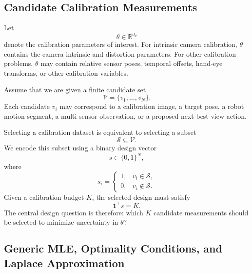 \documentclass[letterpaper, 9
 pt, conference]{ieeeconf}
\begin{document}
\subsection{Candidate Calibration Measurements}
\label{subsec:candidate_measurements}

Let
\begin{equation}
    \theta \in \mathbb{R}^{d_\theta}
\end{equation}
denote the calibration parameters of interest. For intrinsic camera calibration, $\theta$ contains the camera intrinsic and distortion parameters. For other calibration problems, $\theta$ may contain relative sensor poses, temporal offsets, hand-eye transforms, or other calibration variables.

Assume that we are given a finite candidate set
\begin{equation}
    \mathcal{V}=\{v_1,\ldots,v_N\}.
\end{equation}
Each candidate $v_i$ may correspond to a calibration image, a target pose, a robot motion segment, a multi-sensor observation, or a proposed next-best-view action.

Selecting a calibration dataset is equivalent to selecting a subset
\begin{equation}
    \mathcal{S}\subseteq\mathcal{V}.
\end{equation}
We encode this subset using a binary design vector
\begin{equation}
    s\in\{0,1\}^{N},
\end{equation}
where
\begin{equation}
    s_i =
    \begin{cases}
        1, & v_i\in\mathcal{S},\\
        0, & v_i\notin\mathcal{S}.
    \end{cases}
\end{equation}
Given a calibration budget $K$, the selected design must satisfy
\begin{equation}
    \mathbf{1}^{\top}s=K.
\end{equation}
The central design question is therefore: which $K$ candidate measurements should be selected to minimize uncertainty in $\theta$?

\subsection{Generic MLE, Optimality Conditions, and Laplace Approximation}
\label{subsec:mle_laplace}
\end{document}
